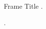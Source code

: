 \documentclass{beamer}
\begin{document}
\begin{frame}[allowframebreaks=0.8]{Frame Title}
    .

    \framebreak
    .
\end{frame}
\end{document}
